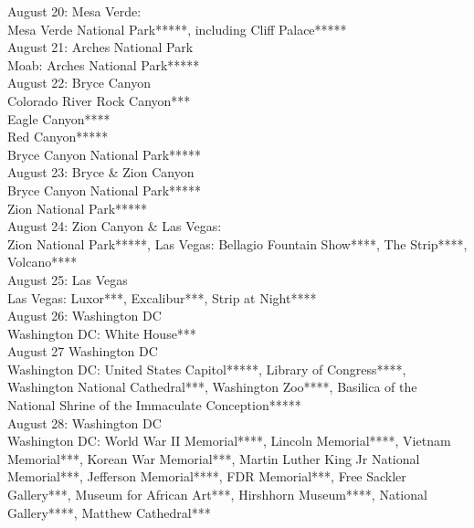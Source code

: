 August 20: Mesa Verde: \\
Mesa Verde National Park*****, including Cliff Palace*****\\

August 21: Arches National Park\\
Moab: Arches National Park*****\\

August 22: Bryce Canyon\\
Colorado River Rock Canyon***\\
Eagle Canyon****\\
Red Canyon*****\\
Bryce Canyon National Park*****\\

August 23: Bryce \& Zion Canyon\\
Bryce Canyon National Park*****\\
 Zion National Park*****\\

August 24: Zion Canyon \& Las Vegas:\\
Zion National Park*****, 
Las Vegas: Bellagio Fountain Show****, The Strip****, Volcano****\\

August 25: Las Vegas\\
Las Vegas: Luxor***, Excalibur***, Strip at Night****\\

August 26: Washington DC\\
Washington DC: White House***\\

August 27 Washington DC\\
Washington DC: United States Capitol*****,  Library of Congress****, Washington National Cathedral***, Washington Zoo****, Basilica of the National Shrine of the Immaculate Conception*****\\

August 28: Washington DC\\
Washington DC: World War II Memorial****, Lincoln Memorial****, Vietnam Memorial***, Korean War Memorial***, Martin Luther King Jr National Memorial***, Jefferson Memorial****, FDR Memorial***, Free Sackler Gallery***, Museum for African Art***, Hirshhorn Museum****, National Gallery****, Matthew Cathedral***\\

